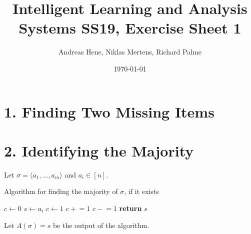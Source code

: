 \documentclass{article}
\newcommand{\pluseq}{\mathrel{+}=}
\newcommand{\minuseq}{\mathrel{-}=}
\newenvironment{claim}[1]{\par\noindent\underline{Claim:}\space#1}{}
\begin{document}
\title{Intelligent Learning and Analysis Systems SS19, Exercise Sheet 1}
\author{Andreas Hene, Niklas Mertens, Richard Palme}
\date{\today}
\maketitle

\section*{1. Finding Two Missing Items}



\section*{2. Identifying the Majority}

Let $\sigma = \langle a_1, \hdots, a_m \rangle$ and $a_i \in [n]$. \\

\begin{algorithm}
\caption{Algorithm for finding the majority of $\sigma$, if it exists}
\begin{algorithmic}[1]

\State $c \gets 0$
        \State$s \gets a_i$
        \State$c \gets 1$
    \EndIf
        \State$c \pluseq 1$
    \Else
        \State$c \minuseq 1$
    \EndIf
\EndFor
\State\textbf{return} $s$

\end{algorithmic}
\end{algorithm}

Let $A(\sigma) = s$ be the output of the algorithm. \\

\end{document}
